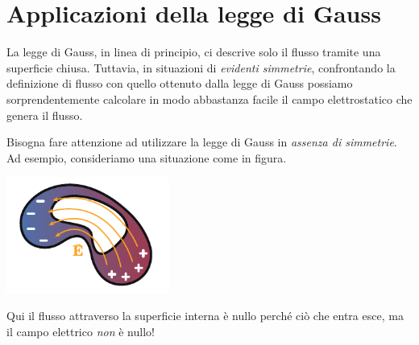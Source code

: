 \section{Applicazioni della legge di Gauss}
La legge di Gauss, in linea di principio, ci descrive solo il flusso tramite una superficie chiusa. Tuttavia, in situazioni di \textit{evidenti simmetrie}, confrontando la definizione di flusso con quello ottenuto dalla legge di Gauss possiamo sorprendentemente calcolare in modo abbastanza facile il campo elettrostatico che genera il flusso.
\begin{attention}
	Bisogna fare attenzione ad utilizzare la legge di Gauss in \textit{assenza di simmetrie}. Ad esempio, consideriamo una situazione come in figura.
	\begin{center}
		\includegraphics[width=0.4\textwidth]{images/chp2/chp2gaussnosimm.pdf}
	\end{center}
	Qui il flusso attraverso la superficie interna è nullo perché ciò che entra esce, ma il campo elettrico \textit{non} è nullo!
\end{attention}
